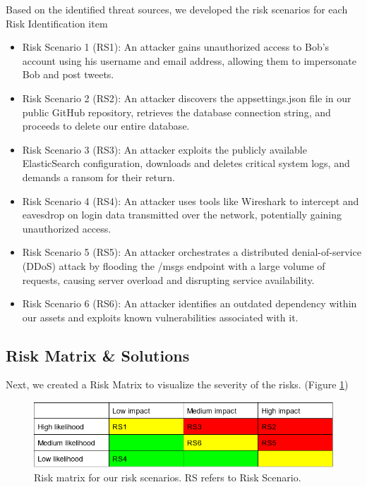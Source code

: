 Based on the identified threat sources, we developed the risk scenarios for each Risk Identification item

\begin{itemize}
\item Risk Scenario 1 (RS1): An attacker gains unauthorized access to Bob's account using his username and email address, allowing them to impersonate Bob and post tweets.
\item Risk Scenario 2 (RS2): An attacker discovers the appsettings.json file in our public GitHub repository, retrieves the database connection string, and proceeds to delete our entire database.
\item Risk Scenario 3 (RS3): An attacker exploits the publicly available ElasticSearch configuration, downloads and deletes critical system logs, and demands a ransom for their return.
\item Risk Scenario 4 (RS4): An attacker uses tools like Wireshark to intercept and eavesdrop on login data transmitted over the network, potentially gaining unauthorized access.
\item Risk Scenario 5 (RS5): An attacker orchestrates a distributed denial-of-service (DDoS) attack by flooding the /msgs endpoint with a large volume of requests, causing server overload and disrupting service availability.
\item Risk Scenario 6 (RS6): An attacker identifies an outdated dependency within our assets and exploits known vulnerabilities associated with it.
\end{itemize}

\subsection{Risk Matrix \& Solutions}

Next, we created a Risk Matrix to visualize the severity of the risks. (Figure \ref{fig:riskmatrix})

\begin{figure}[h]
\centering
\includegraphics[width=1\textwidth]{report/source/images/riskmatrix.png}
\caption{Risk matrix for our risk scenarios. RS refers to Risk Scenario.}
\label{fig:riskmatrix}
\end{figure}

